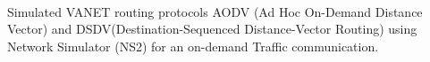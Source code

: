 \documentclass[]{deedy-resume-openfont}
\begin{document}
\hfill
{}\\
Simulated VANET routing protocols AODV (Ad Hoc On-Demand Distance Vector) and DSDV(Destination-Sequenced Distance-Vector Routing) using Network Simulator (NS2) for an on-demand Traffic communication.




\end{document}
